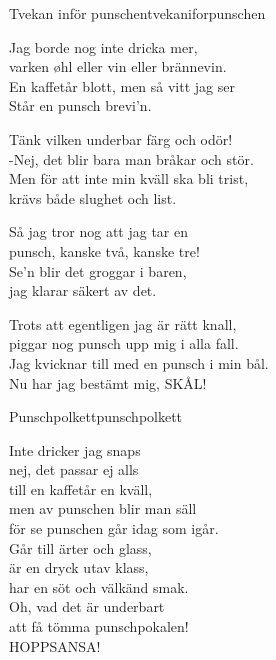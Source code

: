 \newpage
\begin{song}{Tvekan inför punschen}{tvekaniforpunschen}
\begin{vers}
Jag borde nog inte dricka mer,\\
varken øhl eller vin eller brännevin.\\
En kaffetår blott, men så vitt jag ser \\
Står en punsch brevi'n.\\
\end{vers}
\begin{vers}
Tänk vilken underbar färg och odör!\\
-Nej, det blir bara man bråkar och stör.\\
Men för att inte min kväll ska bli trist,\\
krävs både slughet och list.\\
\end{vers}
\begin{vers}
Så jag tror nog att jag tar en\\
punsch, kanske två, kanske tre!\\
Se'n blir det groggar i baren,\\
jag klarar säkert av det.
\end{vers}
\begin{vers}
Trots att egentligen jag är rätt knall,\\
piggar nog punsch upp mig i alla fall.\\
Jag kvicknar till med en punsch i min bål.\\
Nu har jag bestämt mig, SKÅL!\\
\end{vers}
\end{song}

\newpage

\begin{song}{Punschpolkett}{punschpolkett}
\begin{vers}
Inte dricker jag snaps\\
nej, det passar ej alls\\
till en kaffetår en kväll, \\
men av punschen blir man säll\\
för se punschen går idag som igår.\\
Går till ärter och glass,\\ 
är en dryck utav klass,\\
har en söt och välkänd smak.\\
Oh, vad det är underbart\\
att få tömma punschpokalen!\\
HOPPSANSA!\\
\end{vers}
\end{song}

